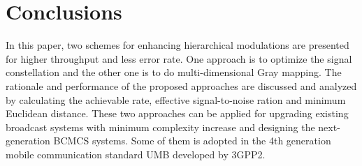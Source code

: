 \documentclass[10pt,fleqn, twocolumn]{IEEEtran}
\begin{document}
\section{Conclusions}
In this paper, two schemes for enhancing hierarchical modulations
are presented for higher throughput and less error rate. One
approach is to optimize the signal constellation and the other one
is to do multi-dimensional Gray mapping. The rationale and
performance of the proposed approaches are discussed and analyzed
by calculating the achievable rate, effective signal-to-noise
ration and minimum Euclidean distance. These two approaches can be
applied for upgrading existing broadcast systems with minimum
complexity increase and designing the next-generation BCMCS
systems. Some of them is adopted in the 4th generation mobile
communication standard UMB developed by 3GPP2. \small


\end{document}
